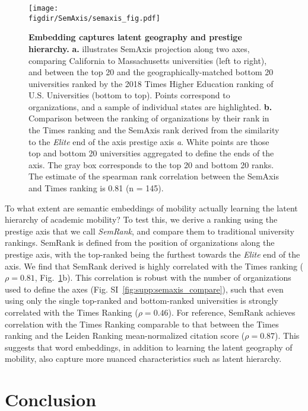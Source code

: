 \documentclass[12pt]{article} %
\def\figdir{../Figs}
\begin{document}
%
%
\begin{figure}[hp!]
    \centering
    \label{fig:semaxis}
    \texttt{[image: \\figdir/SemAxis/semaxis\_fig.pdf]}
    \caption{
        \textbf{Embedding captures latent geography and prestige hierarchy.}
        \textbf{a.} illustrates SemAxis projection along two axes, comparing California to Massachusetts universities (left to right), and between the top 20 and the geographically-matched bottom 20 universities ranked by the 2018 Times Higher Education ranking of U.S. Universities (bottom to top).
        Points correspond to organizations, and a sample of individual states are highlighted.
        \textbf{b.} Comparison between the ranking of organizations by their rank in the Times ranking and the SemAxis rank derived from the similarity to the \textit{Elite} end of the axis prestige axis \textit{a}.
        White points are those top and bottom 20 universities aggregated to define the ends of the axis.
        The gray box corresponds to the top 20 and bottom 20 ranks.
          The estimate of the spearman rank correlation between the SemAxis and Times ranking is 0.81 (n = 145).
    }
\end{figure}

To what extent are semantic embeddings of mobility actually learning the latent hierarchy of academic mobility?
To test this, we derive a ranking using the prestige axis that we call \textit{SemRank}, and compare them to traditional university rankings.
SemRank is defined from the position of organizations along the prestige axis, with the top-ranked being the furthest towards the \textit{Elite} end of the axis.
We find that SemRank derived is highly correlated with the Times ranking ($\rho = 0.81$, Fig.~\ref{fig:semaxis}b).
This correlation is robust with the number of organizations used to define the axes (Fig. SI~\ref{fig:supp:semaxis_compare}), such that even using only the single top-ranked and bottom-ranked universities is strongly correlated with the Times Ranking ($\rho = 0.46$).
For reference, SemRank achieves correlation with the Times Ranking comparable to that between the Times ranking and the Leiden Ranking mean-normalized citation score ($\rho = 0.87$).
This suggests that word embeddings, in addition to learning the latent geography of mobility, also capture more nuanced characteristics such as latent hierarchy.




%
%
\section*{Conclusion}
\end{document}
